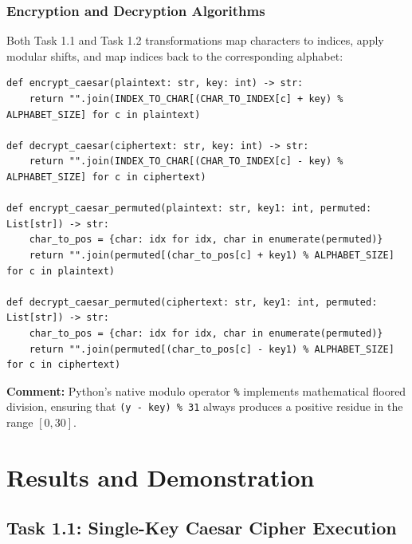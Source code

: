 \documentclass{labreport}
\begin{document}
\subsubsection{Encryption and Decryption Algorithms}
Both Task 1.1 and Task 1.2 transformations map characters to indices, apply modular shifts, and map indices back to the corresponding alphabet:

\begin{lstlisting}[style=python]
def encrypt_caesar(plaintext: str, key: int) -> str:
    return "".join(INDEX_TO_CHAR[(CHAR_TO_INDEX[c] + key) % ALPHABET_SIZE] for c in plaintext)

def decrypt_caesar(ciphertext: str, key: int) -> str:
    return "".join(INDEX_TO_CHAR[(CHAR_TO_INDEX[c] - key) % ALPHABET_SIZE] for c in ciphertext)

def encrypt_caesar_permuted(plaintext: str, key1: int, permuted: List[str]) -> str:
    char_to_pos = {char: idx for idx, char in enumerate(permuted)}
    return "".join(permuted[(char_to_pos[c] + key1) % ALPHABET_SIZE] for c in plaintext)

def decrypt_caesar_permuted(ciphertext: str, key1: int, permuted: List[str]) -> str:
    char_to_pos = {char: idx for idx, char in enumerate(permuted)}
    return "".join(permuted[(char_to_pos[c] - key1) % ALPHABET_SIZE] for c in ciphertext)
\end{lstlisting}
\textbf{Comment:} Python's native modulo operator \texttt{\%} implements mathematical floored division, ensuring that \texttt{(y - key) \% 31} always produces a positive residue in the range $[0, 30]$.

\section{Results and Demonstration}

\subsection{Task 1.1: Single-Key Caesar Cipher Execution}
\end{document}
